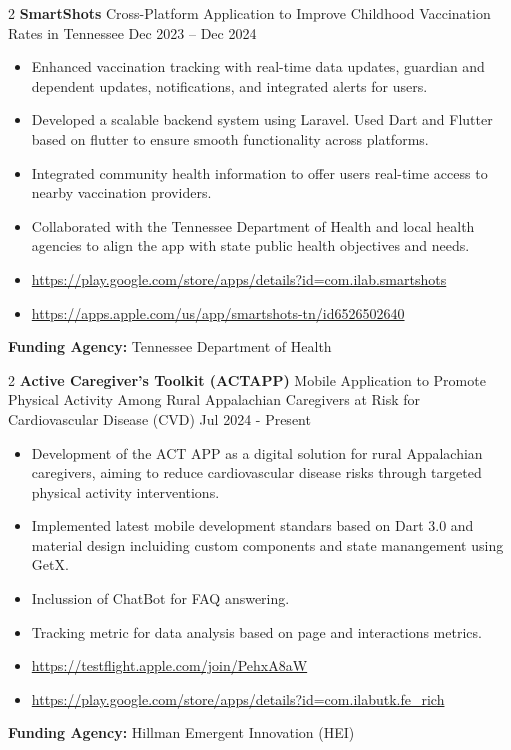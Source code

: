 \documentclass[10pt, letterpaper]{article}
\newenvironment{highlights}{
    \begin{itemize}[
        topsep=0.10 cm,
        parsep=0.10 cm,
        partopsep=0pt,
        itemsep=0pt,
        leftmargin=0 cm + 10pt
    ]
}{
    \end{itemize}
} %
\newenvironment{twocolentry}[2][]{
    \onecolentry
    \def\secondColumn{#2}
    \setcolumnwidth{\fill, 4.5 cm}
    \begin{paracol}{2}
}{
    \switchcolumn \raggedleft \secondColumn
    \end{paracol}
    \endonecolentry
} %
\begin{document}
        \vspace{0.3cm} \begin{twocolentry}{Dec 2023 – Dec 2024} \textbf{SmartShots} \textbar Cross-Platform Application to Improve Childhood Vaccination Rates in Tennessee \end{twocolentry} \begin{highlights} 
            \item Enhanced vaccination tracking with real-time data updates, guardian and dependent updates, notifications, and integrated alerts for users. 
            \item Developed a scalable backend system using Laravel. Used Dart and Flutter based on flutter to ensure smooth functionality across platforms. 
            \item Integrated community health information to offer users real-time access to nearby vaccination providers.
             \item Collaborated with the Tennessee Department of Health and local health agencies to align the app with state public health objectives and needs. 
             \item \url{https://play.google.com/store/apps/details?id=com.ilab.smartshots}
             \item  \url{https://apps.apple.com/us/app/smartshots-tn/id6526502640} \end{highlights} \vspace{0.3cm} \noindent \textbf{Funding Agency:} Tennessee Department of Health
    
    \vspace{0.3cm} \begin{twocolentry}{Jul 2024 - Present} \textbf{Active Caregiver’s Toolkit (ACTAPP)} \textbar Mobile Application to Promote Physical Activity Among Rural Appalachian Caregivers at Risk for Cardiovascular Disease (CVD) \end{twocolentry} \begin{highlights} 
        \item Development of the ACT APP as a digital solution for rural Appalachian caregivers, aiming to reduce cardiovascular disease risks through targeted physical activity interventions. 
        \item Implemented latest mobile development standars based on Dart 3.0 and material design incluiding custom components and state manangement using GetX.
        \item Inclussion of ChatBot for FAQ answering.
        \item Tracking metric for data analysis based on page and interactions metrics.
        \item \url{https://testflight.apple.com/join/PehxA8aW} 
        \item \url{https://play.google.com/store/apps/details?id=com.ilabutk.fe_rich}
    \end{highlights} \vspace{0.3cm} \noindent \textbf{Funding Agency:} Hillman Emergent Innovation (HEI)
\end{document}
